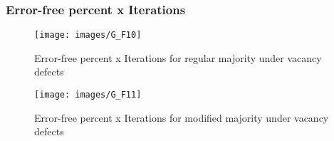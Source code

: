 \subsubsection{Error-free percent x Iterations}

\begin{figure}[h!]
\center
\texttt{[image: images/G\_F10]}
\caption{Error-free percent x Iterations for regular majority under vacancy defects}
\label{figure:majority_reg_gt5}
\end{figure}

\begin{figure}[h!]
\center
\texttt{[image: images/G\_F11]}
\caption{Error-free percent x Iterations for modified majority under vacancy defects}
\label{figure:majority_mod_gt5}
\end{figure}
\pagebreak